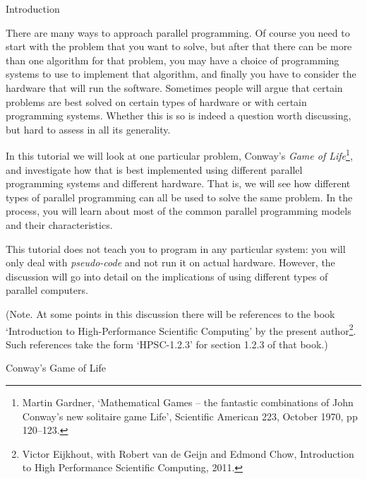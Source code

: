 
 {Introduction}

There are many ways to approach parallel programming. 
Of course you need to start with the problem that you want to solve,
but after that there can be more than one algorithm for that problem,
you may have a choice of programming systems to use
to implement that algorithm, and finally 
you have to consider the hardware that will run 
the software. Sometimes people will argue that certain problems are best solved
on certain types of hardware or with certain programming systems.
Whether this is so is indeed a question worth discussing, but 
hard to assess in all its generality.

In this tutorial we will look at one particular problem, Conway's
\emph{Game of Life}\footnote{Martin Gardner, `Mathematical Games --
  the fantastic combinations of John Conway's new solitaire game
  Life', Scientific American 223, October 1970, pp 120--123.}, and
investigate how that is best implemented using different parallel
programming systems and different hardware. That is, we will see how
different types of parallel programming can all be used to solve the
same problem.  In the process, you will learn about most of the common
parallel programming models and their characteristics.

This tutorial does not teach you to program in any particular
system: you  will only deal with \emph{pseudo-code}
and not run it on actual hardware. However, the discussion
will go into detail on the implications of using different
types of parallel computers.

(Note. At some points in this discussion there will be references to
the book `Introduction to High-Performance Scientific Computing' by
the present author\footnote
{Victor Eijkhout, with Robert van de Geijn and Edmond Chow,
  Introduction to High Performance Scientific Computing, 2011.}. Such
references take the form `HPSC-1.2.3' for section 1.2.3 of that book.)

 {Conway's Game of Life}

